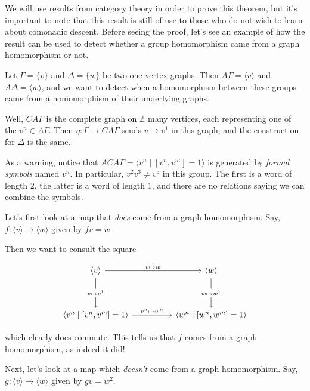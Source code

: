 \documentclass[12pt]{article}
\theoremstyle{definition}
\theoremstyle{theorem}
\begin{document}
We will use results from category theory in order to prove this theorem,
but it's important to note that this result is still of use to those who 
do not wish to learn about comonadic descent. Before seeing the proof,
let's see an example of how the result can be used to detect whether a group 
homomorphism came from a graph homomorphism or not.


Let $\Gamma = \{ v \}$ and $\Delta = \{ w \}$ be two one-vertex graphs.
Then $A \Gamma = \langle v \rangle$ and $A \Delta = \langle w \rangle$,
and we want to detect when a homomorphism between these groups came from a
homomorphism of their underlying graphs.

Well, $CA \Gamma$ is the complete graph on $\mathbb{Z}$ many vertices, each
representing one of the $v^n \in A \Gamma$. 
Then $\eta : \Gamma \to CA \Gamma$ sends $v \mapsto v^1$ in this graph,
and the construction for $\Delta$ is the same.

As a warning, notice that $ACA\Gamma = \langle v^n \mid [v^n, v^m] = 1 \rangle$
is generated by \emph{formal symbols} named $v^n$. In particular,
$v^2 v^3 \neq v^5$ in this group. The first is a word of length $2$, the latter
is a word of length $1$, and there are no relations saying we can combine
the symbols.

\bigskip

Let's first look at a map that \emph{does} come from a graph homomorphism.
Say, $f : \langle v \rangle \to \langle w \rangle$ given by $fv = w$.

Then we want to consult the square

\[\begin{tikzcd}
	{\langle v \rangle} && {\langle w \rangle} \\
	\\
	{\langle v^n \mid [v^n,v^m] = 1 \rangle} && {\langle w^n \mid [w^n, w^m] = 1 \rangle}
	\arrow["{v \mapsto w}", from=1-1, to=1-3]
	\arrow["{v^n \mapsto w^n}", from=3-1, to=3-3]
	\arrow["{v \mapsto v^1}"{description}, from=1-1, to=3-1]
	\arrow["{w \mapsto w^1}"{description}, from=1-3, to=3-3]
\end{tikzcd}\]

which clearly does commute. This tells us that $f$ comes from a graph homomorphism,
as indeed it did!

\bigskip

Next, let's look at a map which \emph{doesn't} come from a graph homomorphism.
Say, $g : \langle v \rangle \to \langle w \rangle$ given by $gv = w^2$.
\end{document}

